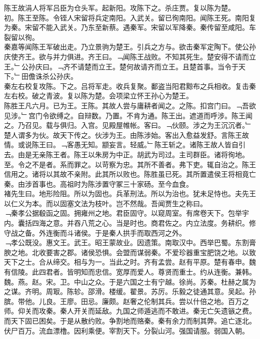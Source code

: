 \documentclass{zhvt-classic}
\begin{document}
\hspace*{2em}陈王故涓人将军吕臣为仓头军。起新阳。攻陈下之。杀庄贾。复以陈为楚。\\
\hspace*{2em}初。陈王至陈。令铚人宋留将兵定南阳。入武关。留已徇南阳。闻陈王死。南阳复为秦。宋留不能入武关。乃东至新蔡。遇秦军。宋留以军降秦。秦传留至咸阳。车裂留以徇。\\
\hspace*{2em}秦嘉等闻陈王军破出走。乃立景驹为楚王。引兵之方与。欲击秦军定陶下。使公孙庆使齐王。欲与并力俱进。齐王曰。﹁闻陈王战败。不知其死生。楚安得不请而立王。﹂公孙庆曰。﹁齐不请楚而立王。楚何故请齐而立王。且楚首事。当令于天下。﹂田儋诛杀公孙庆。\\
\hspace*{2em}秦左右校复攻陈。下之。吕将军走。收兵复聚。鄱盗当阳君黥布之兵相收。复击秦左右校。破之青波。复以陈为楚。会项梁立怀王孙心为楚王。\\
\hspace*{2em}陈胜王凡六月。已为王。王陈。其故人尝与庸耕者闻之。之陈。扣宫门曰。﹁吾欲见涉。﹂宫门令欲缚之。自辩数。乃置。不肯为通。陈王出。遮道而呼涉。陈王闻之。乃召见。载与俱归。入宫。见殿屋帷帐。客曰。﹁伙颐。涉之为王沉沉者。﹂楚人谓多为伙。故天下传之。伙涉为王。由陈涉始。客出入愈益发舒。言陈王故情。或说陈王曰。﹁客愚无知。颛妄言。轻威。﹂陈王斩之。诸陈王故人皆自引去。由是无亲陈王者。陈王以朱房为中正。胡武为司过。主司群臣。诸将徇地。至。令之不是者。系而罪之。以苛察为忠。其所不善者。弗下吏。辄自治之。陈王信用之。诸将以其故不亲附。此其所以败也。陈胜虽已死。其所置遣侯王将相竟亡秦。由涉首事也。高祖时为陈涉置守冢三十家砀。至今血食。\\
\hspace*{2em}褚先生曰。地形险阻。所以为固也。兵革刑法。所以为治也。犹未足恃也。夫先王以仁义为本。而以固塞文法为枝叶。岂不然哉。吾闻贾生之称曰。\\
\hspace*{2em}﹁秦孝公据殽函之固。拥雍州之地。君臣固守。以窥周室。有席卷天下。包举宇内。囊括四海之意。并吞八荒之心。当是时也。商君佐之。内立法度。务耕织。修守战之备。外连衡而斗诸侯。于是秦人拱手而取西河之外。\\
\hspace*{2em}﹁孝公既没。惠文王。武王。昭王蒙故业。因遗策。南取汉中。西举巴蜀。东割膏腴之地。北收要害之郡。诸侯恐惧。会盟而谋弱秦。不爱珍器重宝肥饶之地。以致天下之士。合从缔交。相与为一。当此之时。齐有孟尝。赵有平原。楚有春申。魏有信陵。此四君者。皆明知而忠信。宽厚而爱人。尊贤而重士。约从连衡。兼韩。魏。燕。赵。宋。卫。中山之众。于是六国之士有宁越。徐尚。苏秦。杜赫之属为之谋。齐明。周冣。陈轸。邵滑。楼缓。翟景。苏厉。乐毅之徒通其意。吴起。孙膑。带他。儿良。王廖。田忌。廉颇。赵奢之伦制其兵。尝以什倍之地。百万之师。仰关而攻秦。秦人开关而延敌。九国之师遁逃而不敢进。秦无亡矢遗镞之费。而天下固已困矣。于是从散约败。争割地而赂秦。秦有余力而制其弊。追亡逐北。伏尸百万。流血漂橹。因利乘便。宰割天下。分裂山河。强国请服。弱国入朝。\\
\end{document}
